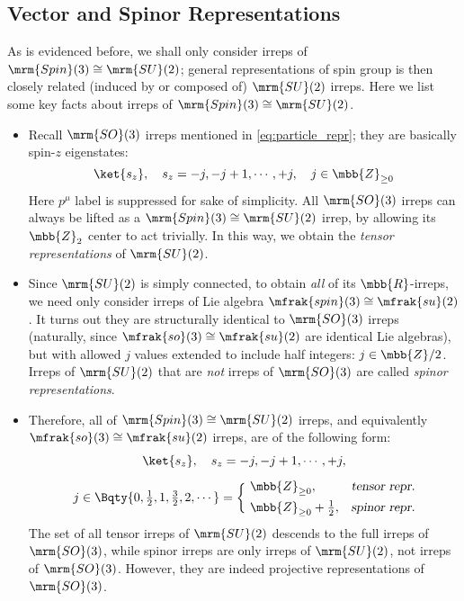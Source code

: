 \documentclass[a4paper,11pt]{article}
\begin{document}
\subsection{Vector and Spinor Representations}
\label{subsect:repr}
	As is evidenced before, we shall only consider irreps of $\mrm{Spin}(3)\cong\mrm{SU}(2)$; general representations of spin group is then closely related (induced by or composed of) $\mrm{SU}(2)$ irreps. Here we list some key facts about irreps of $\mrm{Spin}(3)\cong\mrm{SU}(2)$. 
	\begin{itemize}
	\item Recall $\mrm{SO}(3)$ irreps mentioned in \eqref{eq:particle_repr}; they are basically spin-$z$ eigenstates: 
	\begin{equation}
		\ket{s_z},\quad
		s_z = -j, -j+1,\cdots, +j,\quad
		j\in\mbb{Z}_{\ge 0}
	\end{equation}
	Here $p^\mu$ label is suppressed for sake of simplicity. All $\mrm{SO}(3)$ irreps can always be lifted as a $\mrm{Spin}(3)\cong\mrm{SU}(2)$ irrep, by allowing its $\mbb{Z}_2$ center to act trivially. In this way, we obtain the \textit{tensor representations} of $\mrm{SU}(2)$.
	\item Since $\mrm{SU}(2)$ is simply connected, to obtain \textit{all} of its $\mbb{R}$-irreps, we need only consider irreps of Lie algebra $\mfrak{spin}(3)\cong\mfrak{su}(2)$. It turns out they are structurally identical to $\mrm{SO}(3)$ irreps (naturally, since $\mfrak{so}(3)\cong\mfrak{su}(2)$ are identical Lie algebras), but with allowed $j$ values extended to include half integers: $j\in\mbb{Z}/2$. Irreps of $\mrm{SU}(2)$ that are \textit{not} irreps of $\mrm{SO}(3)$ are called \textit{spinor representations}. 
	\item Therefore, all of $\mrm{Spin}(3)\cong\mrm{SU}(2)$ irreps, and equivalently $\mfrak{so}(3)\cong\mfrak{su}(2)$ irreps, are of the following form:
	\begin{gather}
		\ket{s_z},\quad
		s_z = -j, -j+1,\cdots, +j,\\[1ex]
		j \in \Bqty{
			0,\tfrac{1}{2},1,\tfrac{3}{2},2,\cdots
		} = \bigg\lbrace
		\begin{aligned}
			\ %
			&\mbb{Z}_{\ge 0},
				&&\textsl{tensor repr.}\\
			&\mbb{Z}_{\ge 0} + \tfrac{1}{2},
				&&\textsl{spinor repr.}
		\end{aligned}
	\end{gather}
	The set of all tensor irreps of $\mrm{SU}(2)$ descends to the full irreps of $\mrm{SO}(3)$, while spinor irreps are only irreps of $\mrm{SU}(2)$, not irreps of $\mrm{SO}(3)$. However, they are indeed projective representations of $\mrm{SO}(3)$. 
\pagebreak[4]
	

\end{itemize}
\end{document}
